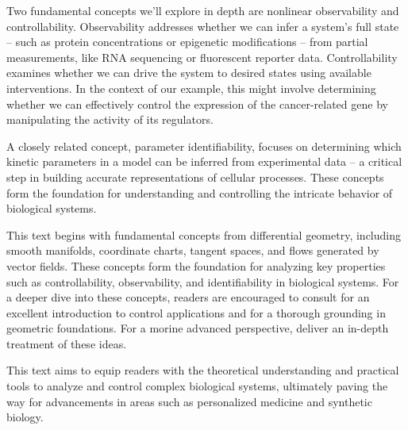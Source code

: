 Two fundamental concepts we'll explore in depth are nonlinear observability and controllability. Observability addresses whether we can infer a system's full state – such as protein concentrations or epigenetic modifications – from partial measurements, like RNA sequencing or fluorescent reporter data. Controllability examines whether we can drive the system to desired states using available interventions. In the context of our example, this might involve determining whether we can effectively control the expression of the cancer-related gene by manipulating the activity of its regulators.

A closely related concept, parameter identifiability, focuses on determining which kinetic parameters in a model can be inferred from experimental data – a critical step in building accurate representations of cellular processes. These concepts form the foundation for understanding and controlling the intricate behavior of biological systems.

This text begins with fundamental concepts from differential geometry, including smooth manifolds, coordinate charts, tangent spaces, and flows generated by vector fields. These concepts form the foundation for analyzing key properties such as controllability, observability, and identifiability in biological systems. For a deeper dive into these concepts, readers are encouraged to consult \cite{nijmeijer_nonlinear_1990}  for an excellent introduction to control applications and \cite{boothby_2002} for a thorough grounding in geometric foundations. For a morine advanced perspective, \cite{abraham_manifolds_1988} deliver an in-depth treatment of these ideas. 

This text aims to equip readers with the theoretical understanding and practical tools to analyze and control complex biological systems, ultimately paving the way for advancements in areas such as personalized medicine and synthetic biology.





